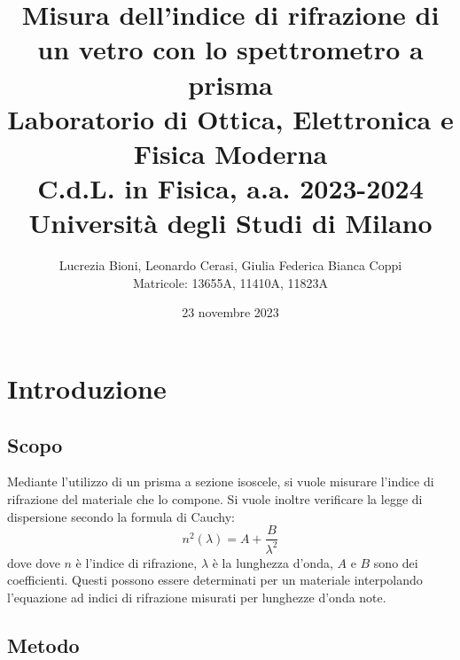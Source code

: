\documentclass[]{article}
\title{%
    \Huge Misura dell'indice di rifrazione di un vetro con lo spettrometro a prisma \\
    \Large Laboratorio di Ottica, Elettronica e Fisica Moderna \\ C.d.L. in Fisica, a.a. 2023-2024 \\ Università degli Studi di Milano}
\author{\LARGE Lucrezia Bioni, Leonardo Cerasi, Giulia Federica Bianca Coppi \\ Matricole: 13655A, 11410A, 11823A}
\date{23 novembre 2023}
\let\oldsection\section%
\renewcommand{\section}{%
	\renewcommand{\theequation}{\thesection.\arabic{equation}}%
	\oldsection}%
\let\oldsubsection\subsection%
\renewcommand{\subsection}{%
	\renewcommand{\theequation}{\thesubsection.\arabic{equation}}%
	\oldsubsection}%
\begin{document}
    \maketitle

    \section{Introduzione}

    \subsection{Scopo}

    Mediante l'utilizzo di un prisma a sezione isoscele, si vuole misurare l'indice di rifrazione del materiale che lo compone. Si vuole inoltre verificare la legge di dispersione secondo la formula di Cauchy:
    \begin{equation}
        \label{cauchy}
        n^2(\lambda) = A + \frac{B}{\lambda^2}
    \end{equation}
    dove dove $n$ è l'indice di rifrazione, $\lambda$ è la lunghezza d'onda, $A$ e $B$ sono dei coefficienti. Questi possono essere determinati per un materiale interpolando l'equazione ad indici di rifrazione misurati per lunghezze d'onda note.

    \subsection{Metodo}
\end{document}
